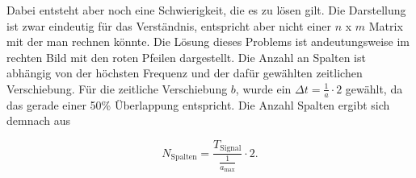Dabei entsteht aber noch eine Schwierigkeit, die es zu lösen gilt. Die Darstellung ist zwar eindeutig für das Verständnis, entspricht aber nicht einer $n$ x $m$ Matrix mit der man rechnen könnte.
Die Lösung dieses Problems ist andeutungsweise im rechten Bild mit den roten Pfeilen dargestellt. Die Anzahl an Spalten ist abhängig von der höchsten Frequenz und der dafür gewählten zeitlichen Verschiebung.
Für die zeitliche Verschiebung $b$, wurde ein $\Delta t=\frac{1}{a}\cdot2$ gewählt, da das gerade einer 50\% Überlappung entspricht. Die Anzahl Spalten ergibt sich demnach aus

\begin{equation}
	N_\text{Spalten}=\frac{T_\text{Signal}}{\frac{1}{a_\text{max}}}\cdot2.
	\label{wavelets:equation7}
\end{equation}


